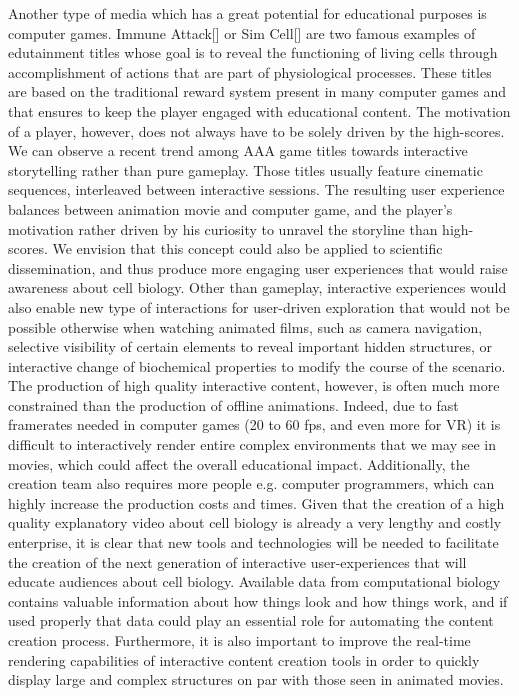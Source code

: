 
Another type of media which has a great potential for educational purposes is computer games.
Immune Attack[] or Sim Cell[] are two famous examples of edutainment titles whose goal is to reveal the functioning of living cells through accomplishment of actions that are part of physiological processes.
These titles are based on the traditional reward system present in many computer games and that ensures to keep the player engaged with educational content.
The motivation of a player, however, does not always have to be solely driven by the high-scores.
We can observe a recent trend among AAA game titles towards interactive storytelling rather than pure gameplay.
Those titles usually feature cinematic sequences, interleaved between interactive sessions.
The resulting user experience balances between animation movie and computer game, and the player's motivation rather driven by his curiosity to unravel the storyline than high-scores.
We envision that this concept could also be applied to scientific dissemination, and thus produce more engaging user experiences that would raise awareness about cell biology.
Other than gameplay, interactive experiences would also enable new type of interactions for user-driven exploration that would not be possible otherwise when watching animated films, such as camera navigation, selective visibility of certain elements to reveal important hidden structures, or interactive change of biochemical properties to modify the course of the scenario.
The production of high quality interactive content, however, is often much more constrained than the production of offline animations.
Indeed, due to fast framerates needed in computer games (20 to 60 fps, and even more for VR) it is difficult to interactively render entire complex environments that we may see in movies, which could affect the overall educational impact. 
Additionally, the creation team also requires more people e.g. computer programmers, which can highly increase the production costs and times. 
Given that the creation of a high quality explanatory video about cell biology is already a very lengthy and costly enterprise, it is clear that new tools and technologies will be needed to facilitate the creation of the next generation of interactive user-experiences that will educate audiences about cell biology. 
Available data from computational biology contains valuable information about how things look and how things work, and if used properly that data could play an essential role for automating the content creation process.
Furthermore, it is also important to improve the real-time rendering capabilities of interactive content creation tools in order to quickly display large and complex structures on par with those seen in animated movies.

